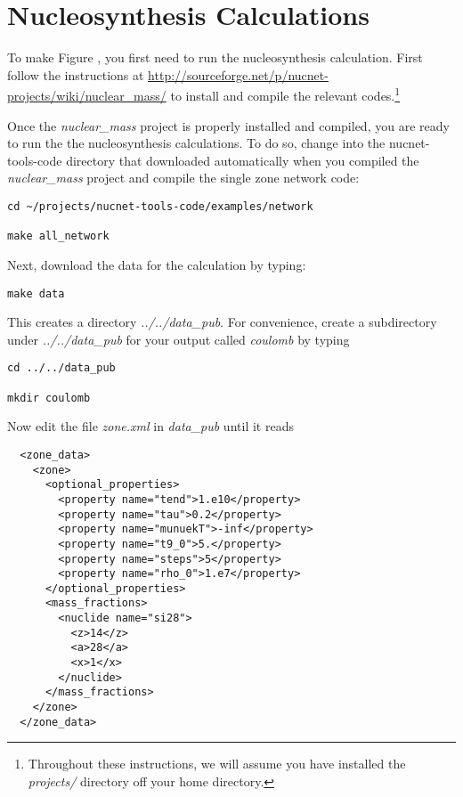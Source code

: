 \section*{Nucleosynthesis Calculations} \hypertarget{sec:single_zone}{}

\hspace{4ex}To make Figure ,
you first need to run the nucleosynthesis calculation.
First follow the instructions at
\url{http://sourceforge.net/p/nucnet-projects/wiki/nuclear_mass/} to install
and compile the relevant codes.\footnote{Throughout these instructions, we will
assume you have installed the {\em projects/} directory off your home
directory.}

Once the {\em nuclear\_mass} project is properly installed and compiled,
you are ready to run the the nucleosynthesis calculations.  To do so,
change into the nucnet-tools-code directory that downloaded automatically
when you compiled the {\em nuclear\_mass} project and compile the single zone
network code:
\begin{verbatim}
cd ~/projects/nucnet-tools-code/examples/network

make all_network
\end{verbatim}
Next, download the data for the calculation by typing:
\begin{verbatim}
make data
\end{verbatim}
This creates a directory {\em ../../data\_pub}.  For convenience, create
a subdirectory under {\em ../../data\_pub} for your output called
{\em coulomb} by typing
\begin{verbatim}
cd ../../data_pub

mkdir coulomb
\end{verbatim}
Now edit
the file {\em zone.xml} in {\em data\_pub} until it reads

\begin{verbatim}
  <zone_data>
    <zone>
      <optional_properties>
        <property name="tend">1.e10</property>
        <property name="tau">0.2</property>
        <property name="munuekT">-inf</property>
        <property name="t9_0">5.</property>
        <property name="steps">5</property>
        <property name="rho_0">1.e7</property>
      </optional_properties>
      <mass_fractions>
        <nuclide name="si28">
          <z>14</z>
          <a>28</a>
          <x>1</x>
        </nuclide>
      </mass_fractions>
    </zone>
  </zone_data>
\end{verbatim}

